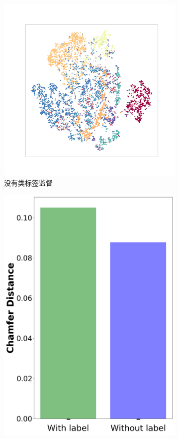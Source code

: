 \documentclass[bachelor, nocolorlinks, printoneside]{seuthesis} %
\begin{document}
\begin{Main}
\begin{figure}
\begin{subfigure}[t]{0.3\linewidth}
    \includegraphics[width=\columnwidth]{figs/T-SNE-noclass.png}
    \caption{没有类标签监督}\label{fig:T-SNE2}
  \end{subfigure}
  \hspace{0.05\linewidth}
  \begin{subfigure}[t]{0.2\linewidth} \centering
    \includegraphics[width=\columnwidth]{figs/label-or-not.png}

\end{subfigure}
\end{figure}
\end{Main}
\end{document}
